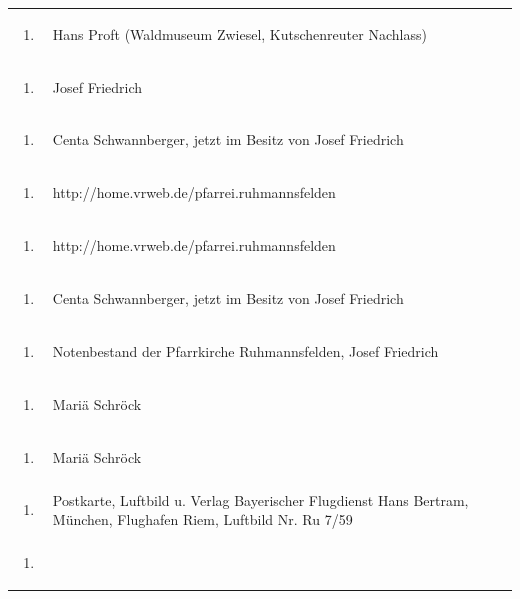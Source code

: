 \documentclass[a4paper]{article}
\begin{document}
\begin{flushleft}
\begin{supertabular}{m{1.2409999cm}m{14.604cm}}
\begin{enumerate}
\item
\end{enumerate}
 &
Hans Proft (Waldmuseum Zwiesel, Kutschenreuter Nachlass)\\
\begin{enumerate}
\item
\end{enumerate}
 &
Josef Friedrich\\
\begin{enumerate}
\item
\end{enumerate}
 &
Centa Schwannberger, jetzt im Besitz von Josef Friedrich\\
\begin{enumerate}
\item
\end{enumerate}
 &
http://home.vrweb.de/pfarrei.ruhmannsfelden\\
\begin{enumerate}
\item
\end{enumerate}
 &
http://home.vrweb.de/pfarrei.ruhmannsfelden\\
\begin{enumerate}
\item
\end{enumerate}
 &
Centa Schwannberger, jetzt im Besitz von Josef Friedrich\\
\begin{enumerate}
\item
\end{enumerate}
 &
Notenbestand der Pfarrkirche Ruhmannsfelden, Josef Friedrich\\
\begin{enumerate}
\item
\end{enumerate}
 &
Mariä Schröck\\
\begin{enumerate}
\item
\end{enumerate}
 &
Mariä Schröck\\
\begin{enumerate}
\item
\end{enumerate}
 &
Postkarte, Luftbild u. Verlag Bayerischer Flugdienst Hans Bertram,
München, Flughafen Riem, Luftbild Nr. Ru 7/59\\
\begin{enumerate}
\item
\end{enumerate}

\end{supertabular}
\end{flushleft}
\end{document}
